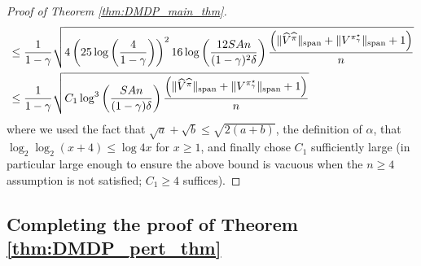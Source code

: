 \documentclass{article}
\theoremstyle{plain}
\theoremstyle{plain}
\theoremstyle{remark}
\theoremstyle{plain}
\theoremstyle{plain}
\newcommand{\Vhat}{\widehat{V}}
\newcommand{\pistar}{\pi^\star}
\newcommand{\pihat}{\widehat{\pi}}
\begin{document}
\begin{proof}[Proof of Theorem \ref{thm:DMDP_main_thm}]
\begin{align*}
        &\leq \frac{1  }{1-\gamma}\sqrt{4\left(25 \log \left( \frac{4}{1-\gamma}\right)\right)^2 16 \log \left(\frac{12 SA n}{(1-\gamma)^2\delta}  \right)\frac{ \left( \spannorm{\Vhat^{\pihat}} +\spannorm{V^{\pistar_\gamma}}+ 1\right)}{n}} \\
        & \leq \frac{1  }{1-\gamma}\sqrt{ C_1\log^3 \left(\frac{ SA n}{(1-\gamma)\delta}  \right)\frac{ \left( \spannorm{\Vhat^{\pihat}} +\spannorm{V^{\pistar_\gamma}}+ 1\right)}{n}} 
    \end{align*}
    where we used the fact that $\sqrt{a} + \sqrt{b} \leq \sqrt{2(a+b)}$, the definition of $\alpha$, that $\log_2 \log_2 (x+4) \leq \log 4x$ for $x \geq 1$, and finally chose $C_1$ sufficiently large (in particular large enough to ensure the above bound is vacuous when the $n \geq 4$ assumption is not satisfied; $C_1 \geq 4$ suffices).
\end{proof}

\subsection{Completing the proof of Theorem \ref{thm:DMDP_pert_thm}}
\label{sec:DMDP_pert_pf}
\end{document}
